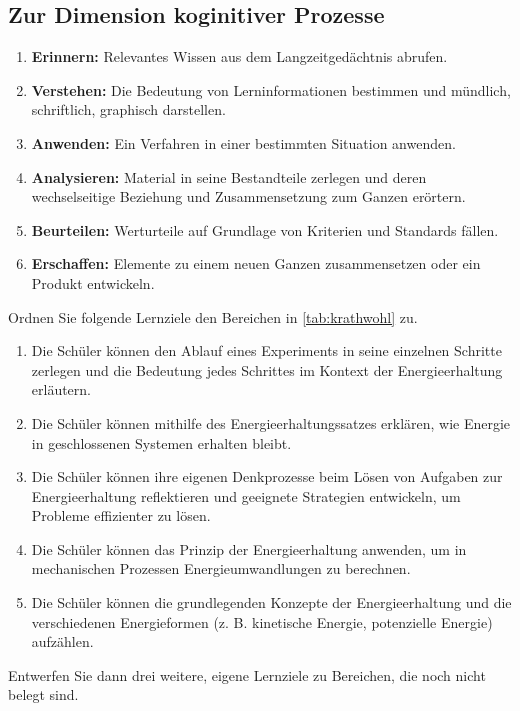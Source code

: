 \subsection{Zur Dimension koginitiver Prozesse}
\begin{enumerate}
	\item \textbf{Erinnern:} Relevantes Wissen aus dem Langzeitgedächtnis abrufen.
	\item \textbf{Verstehen:} Die Bedeutung von Lerninformationen bestimmen und mündlich, schriftlich, graphisch darstellen.
	\item \textbf{Anwenden:} Ein Verfahren in einer bestimmten Situation anwenden.
	\item \textbf{Analysieren:} Material in seine Bestandteile zerlegen und deren wechselseitige Beziehung und Zusammensetzung zum Ganzen erörtern.
	\item \textbf{Beurteilen:} Werturteile auf Grundlage von Kriterien und Standards fällen.
	\item \textbf{Erschaffen:} Elemente zu einem neuen Ganzen zusammensetzen oder ein Produkt entwickeln.
\end{enumerate}

\begin{uea}
	Ordnen Sie folgende Lernziele den Bereichen in \cref{tab:krathwohl} zu.
	\begin{enumerate}[label=\alph*.]
		\item Die Schüler können den Ablauf eines Experiments in seine einzelnen Schritte zerlegen und die Bedeutung jedes Schrittes im Kontext der Energieerhaltung erläutern.
		\item Die Schüler können mithilfe des Energieerhaltungssatzes erklären, wie Energie in geschlossenen Systemen erhalten bleibt.
		\item Die Schüler können ihre eigenen Denkprozesse beim Lösen von Aufgaben zur Energieerhaltung reflektieren und geeignete Strategien entwickeln, um Probleme effizienter zu lösen.
		\item Die Schüler können das Prinzip der Energieerhaltung anwenden, um in mechanischen Prozessen Energieumwandlungen zu berechnen.
		\item Die Schüler können die grundlegenden Konzepte der Energieerhaltung und die verschiedenen Energieformen (z. B. kinetische Energie, potenzielle Energie) aufzählen.
	\end{enumerate}
	Entwerfen Sie dann drei weitere, eigene Lernziele zu Bereichen, die noch nicht belegt sind.
	
	\flushright{}
\end{uea}

